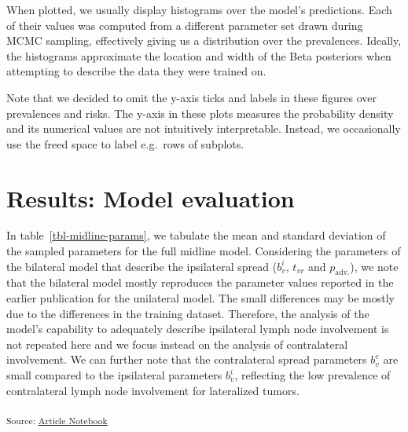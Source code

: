 \documentclass[
  sn-mathphys-num,
]{sn-jnl}
\begin{document}
When plotted, we usually display histograms over the model's
predictions. Each of their values was computed from a different
parameter set drawn during MCMC sampling, effectively giving us a
distribution over the prevalences. Ideally, the histograms approximate
the location and width of the Beta posteriors when attempting to
describe the data they were trained on.

Note that we decided to omit the y-axis ticks and labels in these
figures over prevalences and risks. The y-axis in these plots measures
the probability density and its numerical values are not intuitively
interpretable. Instead, we occasionally use the freed space to label
e.g.~rows of subplots.

\section{Results: Model evaluation}\label{sec-results}

In table~\ref{tbl-midline-params}, we tabulate the mean and standard
deviation of the sampled parameters for the full midline model.
Considering the parameters of the bilateral model that describe the
ipsilateral spread (\(b^i_v\), \(t_{vr}\) and \(p_\text{adv.}\)), we
note that the bilateral model mostly reproduces the parameter values
reported in the earlier publication \citep{ludwig_modelling_2023} for
the unilateral model. The small differences may be mostly due to the
differences in the training dataset. Therefore, the analysis of the
model's capability to adequately describe ipsilateral lymph node
involvement is not repeated here and we focus instead on the analysis of
contralateral involvement. We can further note that the contralateral
spread parameters \(b^c_v\) are small compared to the ipsilateral
parameters \(b^i_v\), reflecting the low prevalence of contralateral
lymph node involvement for lateralized tumors.

\textsubscript{Source:
\href{https://rmnldwg.github.io/bilateral-paper/manuscript-preview.html}{Article
Notebook}}
\end{document}
